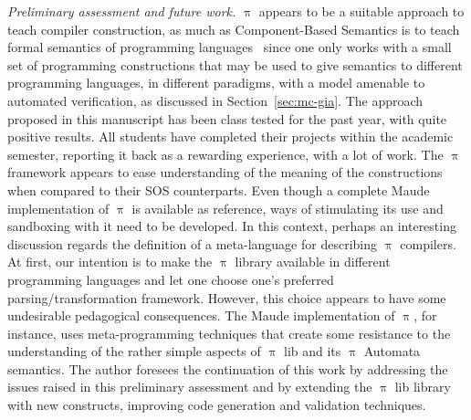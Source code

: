 \documentclass[a4paper,openany]{book}
\begin{document}
\emph{Preliminary assessment and future work.} $\uppi$ appears to be a suitable approach to teach compiler construction, as much as Component-Based Semantics is to teach formal semantics of programming languages~\cite{Mosses:2004:FCF} since one only works with a small set of programming constructions that may be used to give semantics to different programming languages, in different paradigms, with a model amenable to automated verification, as discussed in Section~\ref{sec:mc-gia}. 
The approach proposed in this manuscript has been class tested for the past year, with quite positive results. All students have completed their projects within the academic semester, reporting it back as a rewarding experience, with a lot of work. The $\uppi$ framework appears to ease understanding of the meaning of the constructions when compared to their SOS counterparts. 
Even though a complete Maude implementation of $\uppi$ is available as reference, ways of stimulating its use and sandboxing with it need to be developed.
%
In this context, perhaps an interesting discussion regards the definition of a meta-language for describing $\uppi$ compilers. At first, our intention is to make the $\uppi$ library available in different programming languages and let one choose one's preferred parsing/transformation framework. However, this choice appears to have some undesirable pedagogical consequences. The Maude implementation of $\uppi$, for instance, uses  meta-programming techniques that create some resistance to the understanding of the rather simple aspects of $\uppi$ lib and its $\uppi$ Automata semantics. 
%
The author foresees the continuation of this work by addressing the issues raised in this preliminary assessment and by extending the $\uppi$ lib library with new constructs, improving code generation and validation techniques.
\end{document}
